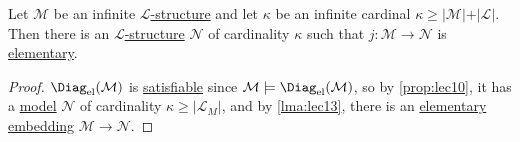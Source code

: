 \begin{theorem}\label{thm:upward-Lowenheim-Skolem}
	Let \(\mathcal{M} \) be an infinite \hyperref[def:structure]{\(\mathcal{L} \)-structure} and let \(\kappa \) be an infinite cardinal \(\kappa \geq \vert \mathcal{M}  \vert + \vert \mathcal{L} \vert \). Then there is an \hyperref[def:structure]{\(\mathcal{L} \)-structure} \(\mathcal{N} \) of cardinality \(\kappa \) such that \(j\colon \mathcal{M} \to \mathcal{N} \) is \hyperref[def:elementary-embedding]{elementary}.
\end{theorem}
\begin{proof}
	\(\Diag_{\mathrm{el} }(\mathcal{M} )\) is \hyperref[def:satisfiable]{satisfiable} since \(\mathcal{M} \models \Diag_{\mathrm{el} }(\mathcal{M} )\), so by \autoref{prop:lec10}, it has a \hyperref[def:model]{model} \(\mathcal{N} \) of cardinality \(\kappa \geq \vert \mathcal{L} _M \vert \), and by \autoref{lma:lec13}, there is an \hyperref[def:elementary-embedding]{elementary embedding} \(\mathcal{M} \to \mathcal{N} \).
\end{proof}

